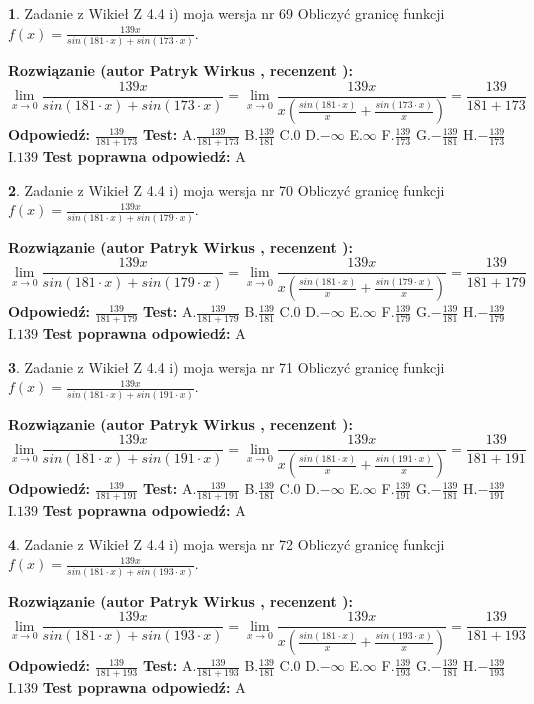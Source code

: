 \documentclass[12pt, a4paper]{article}
\theoremstyle{definition} %
\newtheorem{zad}{}
\newcommand{\zadStart}[1]{\begin{zad}#1\newline}
\newcommand{\zadStop}{\end{zad}}
\newcommand{\rozwStart}[2]{\noindent \textbf{Rozwiązanie (autor #1 , recenzent #2): }\newline}
\newcommand{\rozwStop}{\newline}
\newcommand{\odpStart}{\noindent \textbf{Odpowiedź:}\newline}
\newcommand{\odpStop}{\newline}
\newcommand{\testStart}{\noindent \textbf{Test:}\newline}
\newcommand{\testStop}{\newline}
\newcommand{\kluczStart}{\noindent \textbf{Test poprawna odpowiedź:}\newline}
\newcommand{\kluczStop}{\newline}
\begin{document}
\zadStart{Zadanie z Wikieł Z 4.4 i) moja wersja nr 69}
Obliczyć granicę funkcji $f(x)=\frac{139x}{sin(181\cdot x) +sin(173\cdot x)}$.
\zadStop
\rozwStart{Patryk Wirkus}{}
$$\lim\limits_{x\to 0}\frac{139x}{sin(181\cdot x) +sin(173\cdot x)}=\lim\limits_{x\to 0}\frac{139x}{x(\frac{sin(181\cdot x)}{x}+\frac{sin(173\cdot x)}{x})}=\frac{139}{181+173}$$
\rozwStop
\odpStart
$\frac{139}{181+173}$
\odpStop
\testStart
A.$\frac{139}{181+173}$
B.$\frac{139}{181}$
C.$0$
D.$-\infty$
E.$\infty$
F.$\frac{139}{173}$
G.$-\frac{139}{181}$
H.$-\frac{139}{173}$
I.$139$
\testStop
\kluczStart
A
\kluczStop



\zadStart{Zadanie z Wikieł Z 4.4 i) moja wersja nr 70}
Obliczyć granicę funkcji $f(x)=\frac{139x}{sin(181\cdot x) +sin(179\cdot x)}$.
\zadStop
\rozwStart{Patryk Wirkus}{}
$$\lim\limits_{x\to 0}\frac{139x}{sin(181\cdot x) +sin(179\cdot x)}=\lim\limits_{x\to 0}\frac{139x}{x(\frac{sin(181\cdot x)}{x}+\frac{sin(179\cdot x)}{x})}=\frac{139}{181+179}$$
\rozwStop
\odpStart
$\frac{139}{181+179}$
\odpStop
\testStart
A.$\frac{139}{181+179}$
B.$\frac{139}{181}$
C.$0$
D.$-\infty$
E.$\infty$
F.$\frac{139}{179}$
G.$-\frac{139}{181}$
H.$-\frac{139}{179}$
I.$139$
\testStop
\kluczStart
A
\kluczStop



\zadStart{Zadanie z Wikieł Z 4.4 i) moja wersja nr 71}
Obliczyć granicę funkcji $f(x)=\frac{139x}{sin(181\cdot x) +sin(191\cdot x)}$.
\zadStop
\rozwStart{Patryk Wirkus}{}
$$\lim\limits_{x\to 0}\frac{139x}{sin(181\cdot x) +sin(191\cdot x)}=\lim\limits_{x\to 0}\frac{139x}{x(\frac{sin(181\cdot x)}{x}+\frac{sin(191\cdot x)}{x})}=\frac{139}{181+191}$$
\rozwStop
\odpStart
$\frac{139}{181+191}$
\odpStop
\testStart
A.$\frac{139}{181+191}$
B.$\frac{139}{181}$
C.$0$
D.$-\infty$
E.$\infty$
F.$\frac{139}{191}$
G.$-\frac{139}{181}$
H.$-\frac{139}{191}$
I.$139$
\testStop
\kluczStart
A
\kluczStop



\zadStart{Zadanie z Wikieł Z 4.4 i) moja wersja nr 72}
Obliczyć granicę funkcji $f(x)=\frac{139x}{sin(181\cdot x) +sin(193\cdot x)}$.
\zadStop
\rozwStart{Patryk Wirkus}{}
$$\lim\limits_{x\to 0}\frac{139x}{sin(181\cdot x) +sin(193\cdot x)}=\lim\limits_{x\to 0}\frac{139x}{x(\frac{sin(181\cdot x)}{x}+\frac{sin(193\cdot x)}{x})}=\frac{139}{181+193}$$
\rozwStop
\odpStart
$\frac{139}{181+193}$
\odpStop
\testStart
A.$\frac{139}{181+193}$
B.$\frac{139}{181}$
C.$0$
D.$-\infty$
E.$\infty$
F.$\frac{139}{193}$
G.$-\frac{139}{181}$
H.$-\frac{139}{193}$
I.$139$
\testStop
\kluczStart
A
\kluczStop
\end{document}

